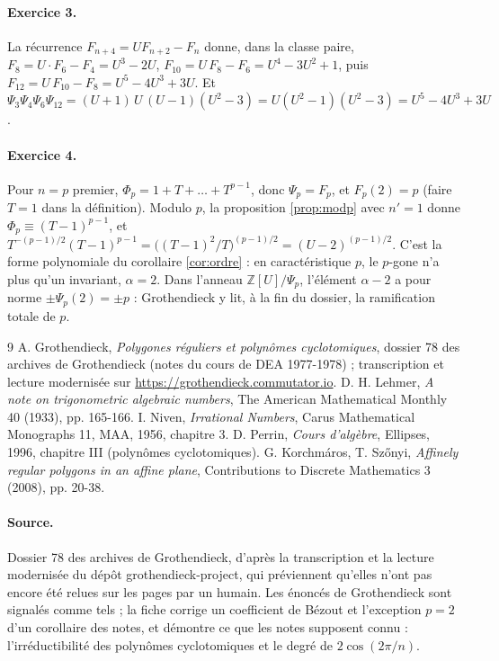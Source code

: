 \documentclass[11pt,a4paper]{article}
\theoremstyle{plain}
\theoremstyle{definition}
\theoremstyle{remark}
\newcommand{\Z}{\mathbb{Z}}
\begin{document}
\paragraph{Exercice 3.} La récurrence $F_{n+4}=UF_{n+2}-F_n$ donne, dans la classe paire, $F_8=U\cdot F_6-F_4=U^3-2U$, $F_{10}=U\,F_8-F_6=U^4-3U^2+1$, puis $F_{12}=U\,F_{10}-F_8=U^5-4U^3+3U$. Et $\Psi_3\Psi_4\Psi_6\Psi_{12}=(U+1)\,U\,(U-1)(U^2-3)=U(U^2-1)(U^2-3)=U^5-4U^3+3U$.

\paragraph{Exercice 4.} Pour $n=p$ premier, $\Phi_p=1+T+\dots+T^{p-1}$, donc $\Psi_p=F_p$, et $F_p(2)=p$ (faire $T=1$ dans la définition). Modulo $p$, la proposition \ref{prop:modp} avec $n'=1$ donne $\Phi_p\equiv(T-1)^{p-1}$, et $T^{-(p-1)/2}(T-1)^{p-1}=\big((T-1)^2/T\big)^{(p-1)/2}=(U-2)^{(p-1)/2}$. C'est la forme polynomiale du corollaire \ref{cor:ordre} : en caractéristique $p$, le $p$-gone n'a plus qu'un invariant, $\alpha=2$. Dans l'anneau $\Z[U]/\Psi_p$, l'élément $\alpha-2$ a pour norme $\pm\Psi_p(2)=\pm p$ : Grothendieck y lit, à la fin du dossier, la ramification totale de $p$.

\begin{thebibliography}{9}
 A. Grothendieck, \emph{Polygones réguliers et polynômes cyclotomiques}, dossier 78 des archives de Grothendieck (notes du cours de DEA 1977-1978) ; transcription et lecture modernisée sur \url{https://grothendieck.commutator.io}.
 D. H. Lehmer, \emph{A note on trigonometric algebraic numbers}, The American Mathematical Monthly 40 (1933), pp. 165-166.
 I. Niven, \emph{Irrational Numbers}, Carus Mathematical Monographs 11, MAA, 1956, chapitre 3.
 D. Perrin, \emph{Cours d'algèbre}, Ellipses, 1996, chapitre III (polynômes cyclotomiques).
 G. Korchmáros, T. Szőnyi, \emph{Affinely regular polygons in an affine plane}, Contributions to Discrete Mathematics 3 (2008), pp. 20-38.
\end{thebibliography}

\paragraph{Source.} Dossier 78 des archives de Grothendieck, d'après la transcription et la lecture modernisée du dépôt grothendieck-project, qui préviennent qu'elles n'ont pas encore été relues sur les pages par un humain. Les énoncés de Grothendieck sont signalés comme tels ; la fiche corrige un coefficient de Bézout et l'exception $p=2$ d'un corollaire des notes, et démontre ce que les notes supposent connu : l'irréductibilité des polynômes cyclotomiques et le degré de $2\cos(2\pi/n)$.
\end{document}

